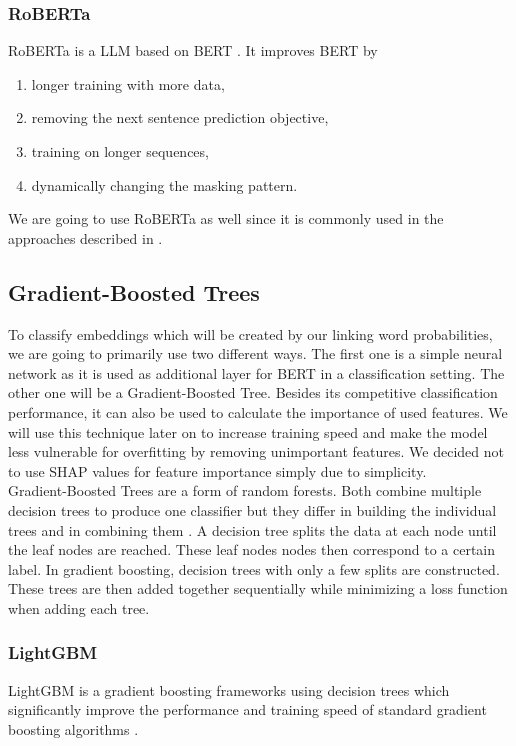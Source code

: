 \subsubsection{RoBERTa}
RoBERTa is a LLM based on BERT \cite{roberta}. It improves BERT by
\begin{enumerate}
	\item longer training with more data,
	\item removing the next sentence prediction objective,
	\item training on longer sequences,
	\item dynamically changing the masking pattern.
\end{enumerate}
We are going to use RoBERTa as well since it is commonly used in the approaches described in \cite{argsvalidnovel2022}.

\subsection{Gradient-Boosted Trees}
To classify embeddings which will be created by our linking word probabilities, we are going to primarily use two different ways. The first one is a simple neural network as it is used as additional layer for BERT in a classification setting. The other one will be a Gradient-Boosted Tree. Besides its competitive classification performance, it can also be used to calculate the importance of used features. We will use this technique later on to increase training speed and make the model less vulnerable for overfitting by removing unimportant features. We decided not to use SHAP values \cite{shap} for feature importance simply due to simplicity. \\
Gradient-Boosted Trees are a form of random forests. Both combine multiple decision trees to produce one classifier but they differ in building the individual trees and in combining them \cite{gradboost}. A decision tree splits the data at each node until the leaf nodes are reached. These leaf nodes nodes then correspond to a certain label. In gradient boosting, decision trees with only a few splits are constructed. These trees are then added together sequentially while minimizing a loss function when adding each tree.

\subsubsection{LightGBM}
LightGBM is a gradient boosting frameworks using decision trees which significantly improve the performance and training speed of standard gradient boosting algorithms \cite{lgbm}.

